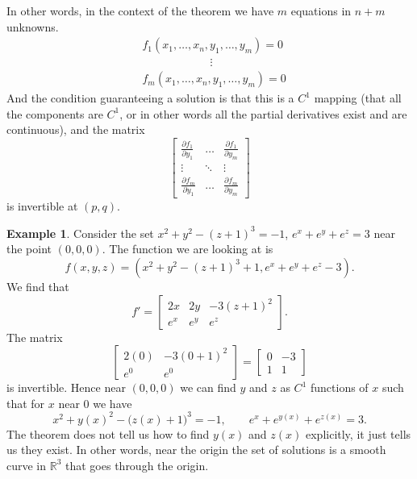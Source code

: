 \documentclass[12pt]{book}
\newcommand{\R}{{\mathbb{R}}}
\theoremstyle{plain}
\theoremstyle{remark}
\theoremstyle{definition}
\theoremstyle{exercise}
\theoremstyle{example}
\newtheorem{example}[thm]{Example}
\begin{document}
In other words, in the context of the theorem we have
$m$ equations in $n+m$ unknowns.
\begin{align*}
& f_1 (x_1,\ldots,x_n,y_1,\ldots,y_m) = 0 \\
& \qquad \qquad \qquad  \vdots \\
& f_m (x_1,\ldots,x_n,y_1,\ldots,y_m) = 0
\end{align*}
And the condition guaranteeing a solution is that this is a $C^1$ mapping (that all the components are
$C^1$, or in other words all the partial derivatives exist
and are continuous), and the matrix
\begin{equation*}
\begin{bmatrix}
\frac{\partial f_1}{\partial y_1}
& \ldots &
\frac{\partial f_1}{\partial y_m}
\\
\vdots & \ddots & \vdots
\\
\frac{\partial f_m}{\partial y_1}
& \ldots &
\frac{\partial f_m}{\partial y_m}
\end{bmatrix}
\end{equation*}
is invertible at $(p,q)$.

\begin{example}
Consider the set $x^2+y^2-{(z+1)}^3 = -1$, $e^x+e^y+e^z = 3$
near the point $(0,0,0)$.
The function we are looking at is
\begin{equation*}
f(x,y,z) = (x^2+y^2-{(z+1)}^3+1,e^x+e^y+e^z-3) .
\end{equation*}
We find that
\begin{equation*}
f' =
\begin{bmatrix}
2x & 2y & -3{(z+1)}^2 \\
e^x & e^y & e^z
\end{bmatrix} .
\end{equation*}
The matrix
\begin{equation*}
\begin{bmatrix}
2(0) & -3{(0+1)}^2 \\
e^0 & e^0
\end{bmatrix}
=
\begin{bmatrix}
0 & -3 \\
1 & 1
\end{bmatrix}
\end{equation*}
is invertible.  Hence near $(0,0,0)$ we can find $y$ and $z$
as $C^1$ functions of $x$ such that for $x$ near 0 we have
\begin{equation*}
x^2+y(x)^2-{\bigl(z(x)+1\bigr)}^3 = -1,
\qquad
e^x+e^{y(x)}+e^{z(x)} = 3 .
\end{equation*}
The theorem does not tell us how to find $y(x)$ and $z(x)$ explicitly,
it just tells us they exist.
In other words, near the origin the set of solutions is a
smooth curve in $\R^3$ that goes through the origin.
\end{example}
\end{document}
